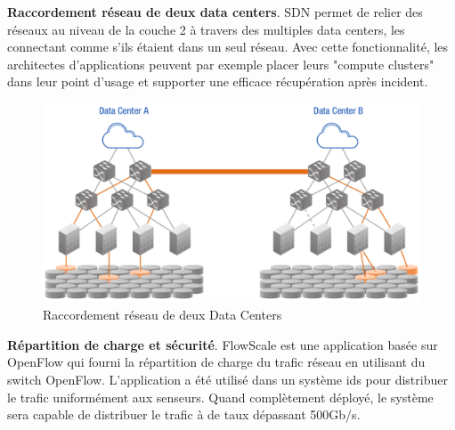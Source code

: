 \textbf{Raccordement réseau de deux data centers}. SDN permet de relier des réseaux au niveau de la couche 2 à travers des multiples data centers, les connectant comme s'ils étaient dans un seul réseau. Avec cette fonctionnalité, les architectes d'applications peuvent par exemple placer leurs "compute clusters" dans leur point d'usage et supporter une efficace récupération après incident. \cite{ODCAusageScenarios}

\begin{figure}[!h] %
\includegraphics[width=15cm]{images/DataCenterL2Bridging.png} %
\caption{ Raccordement réseau de deux Data Centers \cite{ODCAusageScenarios}} %
\label{imgDCL2B} %
\end{figure} %

\textbf{Répartition de charge et sécurité}. FlowScale est une application basée sur OpenFlow qui fourni la répartition de charge du trafic réseau en utilisant du switch OpenFlow. L'application a été utilisé dans un système \gls{ids} pour distribuer le trafic uniformément aux senseurs. Quand complètement déployé, le système sera capable de distribuer le trafic à de taux dépassant 500Gb/s.  \cite{FlowScale}

